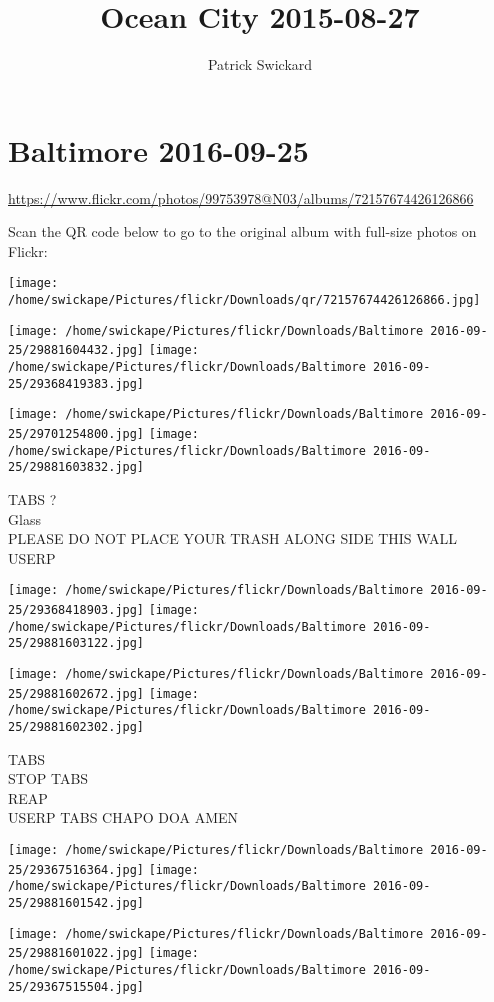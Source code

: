 \documentclass[10pt,letterpaper]{article}
\title{Ocean City 2015-08-27}
\author{Patrick Swickard}
\date{}
\begin{document}
\section*{Baltimore 2016-09-25}

\url{https://www.flickr.com/photos/99753978@N03/albums/72157674426126866}

Scan the QR code below to go to the original album with full-size photos on Flickr:

\texttt{[image: /home/swickape/Pictures/flickr/Downloads/qr/72157674426126866.jpg]}
\pagebreak

\texttt{[image: /home/swickape/Pictures/flickr/Downloads/Baltimore 2016-09-25/29881604432.jpg]}
\texttt{[image: /home/swickape/Pictures/flickr/Downloads/Baltimore 2016-09-25/29368419383.jpg]}

\texttt{[image: /home/swickape/Pictures/flickr/Downloads/Baltimore 2016-09-25/29701254800.jpg]}
\texttt{[image: /home/swickape/Pictures/flickr/Downloads/Baltimore 2016-09-25/29881603832.jpg]}

TABS ?\\
Glass\\
PLEASE DO NOT PLACE YOUR TRASH ALONG SIDE THIS WALL\\
USERP
\pagebreak

\texttt{[image: /home/swickape/Pictures/flickr/Downloads/Baltimore 2016-09-25/29368418903.jpg]}
\texttt{[image: /home/swickape/Pictures/flickr/Downloads/Baltimore 2016-09-25/29881603122.jpg]}

\texttt{[image: /home/swickape/Pictures/flickr/Downloads/Baltimore 2016-09-25/29881602672.jpg]}
\texttt{[image: /home/swickape/Pictures/flickr/Downloads/Baltimore 2016-09-25/29881602302.jpg]}

TABS\\
STOP TABS\\
REAP\\
USERP TABS CHAPO DOA AMEN
\pagebreak

\texttt{[image: /home/swickape/Pictures/flickr/Downloads/Baltimore 2016-09-25/29367516364.jpg]}
\texttt{[image: /home/swickape/Pictures/flickr/Downloads/Baltimore 2016-09-25/29881601542.jpg]}

\texttt{[image: /home/swickape/Pictures/flickr/Downloads/Baltimore 2016-09-25/29881601022.jpg]}
\texttt{[image: /home/swickape/Pictures/flickr/Downloads/Baltimore 2016-09-25/29367515504.jpg]}
\end{document}
